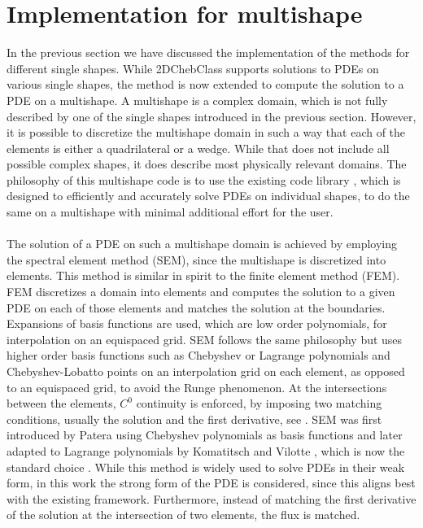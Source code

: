 \section{Implementation for multishape}
In the previous section we have discussed the implementation of the methods for different single shapes. While 2DChebClass supports solutions to PDEs on various single shapes, the method is now extended to compute the solution to a PDE on a multishape. A multishape is a complex domain, which is not fully described by one of the single shapes introduced in the previous section. However, it is possible to discretize the multishape domain in such a way that each of the elements is either a quadrilateral or a wedge. While that does not include all possible complex shapes, it does describe most physically relevant domains. The philosophy of this multishape code is to use the existing code library \cite{GoddardPseudospectralCode1}, which is designed to efficiently and accurately solve PDEs on individual shapes, to do the same on a multishape with minimal additional effort for the user.
\\
\\
The solution of a PDE on such a multishape domain is achieved by employing the spectral element method (SEM), since the multishape is discretized into elements. This method is similar in spirit to the finite element method (FEM). FEM discretizes a domain into elements and computes the solution to a given PDE on each of those elements and matches the solution at the boundaries. Expansions of basis functions are used, which are low order polynomials, for interpolation on an equispaced grid. SEM follows the same philosophy but uses higher order basis functions such as Chebyshev or Lagrange polynomials and Chebyshev-Lobatto points on an interpolation grid on each element, as opposed to an equispaced grid, to avoid the Runge phenomenon. At the intersections between the elements, $C^0$ continuity is enforced, by imposing two matching conditions, usually the solution and the first derivative, see \cite{Boyd1}. SEM was first introduced by Patera \cite{SEMPatera84} using  Chebyshev polynomials as basis functions and later adapted to Lagrange polynomials by Komatitsch and Vilotte \cite{SEMLagrange98}, which is now the standard choice \cite{Boyd1}.
While this method is widely used to solve PDEs in their weak form, in this work the strong form of the PDE is considered, since this aligns best with the existing framework. Furthermore, instead of matching the first derivative of the solution at the intersection of two elements, the flux is matched. 


